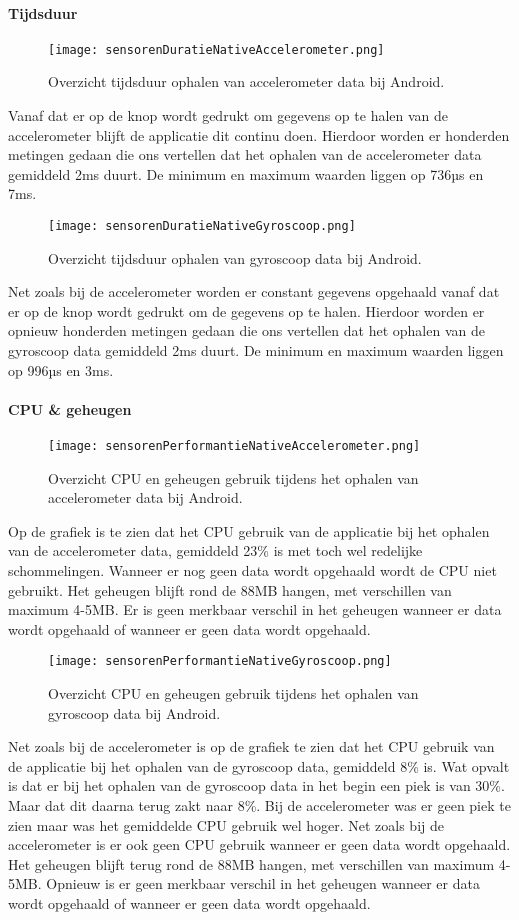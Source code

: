 \paragraph{Tijdsduur}
\begin{figure}[H]
    \centering
    \texttt{[image: sensorenDuratieNativeAccelerometer.png]}
    \caption{Overzicht tijdsduur ophalen van accelerometer data bij Android.}
\end{figure}
Vanaf dat er op de knop wordt gedrukt om gegevens op te halen van de accelerometer blijft de applicatie
dit continu doen. Hierdoor worden er honderden metingen gedaan die ons vertellen dat het ophalen 
van de accelerometer data gemiddeld 2ms duurt. De minimum en maximum waarden liggen op 736µs en 7ms.
\begin{figure}[H]
    \centering
    \texttt{[image: sensorenDuratieNativeGyroscoop.png]}
    \caption{Overzicht tijdsduur ophalen van gyroscoop data bij Android.}
\end{figure}
Net zoals bij de accelerometer worden er constant gegevens opgehaald vanaf dat er op de knop wordt gedrukt om de 
gegevens op te halen. Hierdoor worden er opnieuw honderden metingen gedaan die ons vertellen dat het ophalen 
van de gyroscoop data gemiddeld 2ms duurt. De minimum en maximum waarden liggen op 996µs en 3ms.

\paragraph{CPU \& geheugen}
\begin{figure}[H]
    \centering
    \texttt{[image: sensorenPerformantieNativeAccelerometer.png]}
    \caption{Overzicht CPU en geheugen gebruik tijdens het ophalen van accelerometer data bij Android.}
\end{figure}
Op de grafiek is te zien dat het CPU gebruik van de applicatie bij het ophalen van de accelerometer data,
gemiddeld 23\% is met toch wel redelijke schommelingen. Wanneer er nog geen data wordt opgehaald wordt de CPU niet 
gebruikt. Het geheugen blijft rond de 88MB hangen, met verschillen van maximum 4-5MB. 
Er is geen merkbaar verschil in het geheugen wanneer er data wordt opgehaald of wanneer er 
geen data wordt opgehaald.
\begin{figure}[H]
    \centering
    \texttt{[image: sensorenPerformantieNativeGyroscoop.png]}
    \caption{Overzicht CPU en geheugen gebruik tijdens het ophalen van gyroscoop data bij Android.}
\end{figure}
Net zoals bij de accelerometer is op de grafiek te zien dat het CPU gebruik van de applicatie bij het 
ophalen van de gyroscoop data, gemiddeld 8\% is. Wat opvalt is dat er bij het ophalen van de gyroscoop data
in het begin een piek is van 30\%. Maar dat dit daarna terug zakt naar 8\%. Bij de accelerometer was er geen
piek te zien maar was het gemiddelde CPU gebruik wel hoger. Net zoals bij de accelerometer is er ook geen 
CPU gebruik wanneer er geen data wordt opgehaald. Het geheugen blijft terug rond de 88MB hangen, met 
verschillen van maximum 4-5MB. Opnieuw is er geen merkbaar verschil in het 
geheugen wanneer er data wordt opgehaald of wanneer er geen data wordt opgehaald.
  
